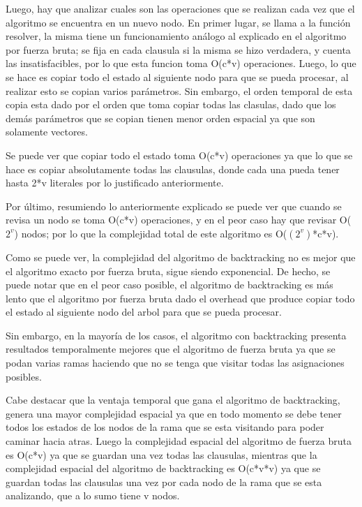 \documentclass[a4paper,10pt]{article}
\begin{document}
Luego, hay que analizar cuales son las operaciones que se realizan cada vez que el algoritmo se encuentra en un nuevo nodo. En primer lugar, se llama a la funci\'on resolver, la misma tiene un funcionamiento an\'alogo al explicado en el algoritmo por fuerza bruta; se fija en cada clausula si la misma se hizo verdadera, y cuenta las insatisfacibles, por lo que esta funcion toma O(c*v) operaciones. Luego, lo que se hace es copiar todo el estado al siguiente nodo para que se pueda procesar, al realizar esto se copian varios par\'ametros. Sin embargo, el orden temporal de esta copia esta dado por el orden que toma copiar todas las clasulas, dado que los dem\'as par\'ametros que se copian tienen menor orden espacial ya que son solamente vectores. 

Se puede ver que copiar todo el estado toma O(c*v) operaciones ya que lo que se hace es copiar absolutamente todas las clausulas, donde cada una pueda tener hasta 2*v literales por lo justificado anteriormente.

Por \'ultimo, resumiendo lo anteriormente explicado se puede ver que cuando se revisa un nodo se toma O(c*v) operaciones, y en el peor caso hay que revisar O($2^{v}$) nodos; por lo que la complejidad total de este algoritmo es O($(2^{v})$*c*v).

Como se puede ver, la complejidad del algoritmo de backtracking no es mejor que el algoritmo exacto por fuerza bruta, sigue siendo exponencial. De hecho, se puede notar que en el peor caso posible, el algoritmo de backtracking es m\'as lento que el algoritmo por fuerza bruta dado el overhead que produce copiar todo el estado al siguiente nodo del arbol para que se pueda procesar.

Sin embargo, en la mayor\'ia de los casos, el algoritmo con backtracking presenta resultados temporalmente mejores que el algoritmo de fuerza bruta ya que se podan varias ramas haciendo que no se tenga que visitar todas las asignaciones posibles.

\medskip

Cabe destacar que la ventaja temporal que gana el algoritmo de backtracking, genera una mayor complejidad espacial ya que en todo momento se debe tener todos los estados de los nodos de la rama que se esta visitando para poder caminar hacia atras. Luego la complejidad espacial del algoritmo de fuerza bruta es O(c*v) ya que se guardan una vez todas las clausulas, mientras que la complejidad espacial del algoritmo de backtracking es O(c*v*v) ya que se guardan todas las clausulas una vez por cada nodo de la rama que se esta analizando, que a lo sumo tiene v nodos.
\end{document}

